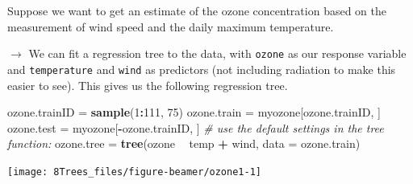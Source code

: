 \documentclass[10pt,ignorenonframetext,]{beamer}
\newenvironment{Shaded}{\begin{snugshade}}{\end{snugshade}}
\newcommand{\KeywordTok}[1]{\textcolor[rgb]{0.13,0.29,0.53}{\textbf{#1}}}
\newcommand{\DataTypeTok}[1]{\textcolor[rgb]{0.13,0.29,0.53}{#1}}
\newcommand{\DecValTok}[1]{\textcolor[rgb]{0.00,0.00,0.81}{#1}}
\newcommand{\StringTok}[1]{\textcolor[rgb]{0.31,0.60,0.02}{#1}}
\newcommand{\CommentTok}[1]{\textcolor[rgb]{0.56,0.35,0.01}{\textit{#1}}}
\newcommand{\OperatorTok}[1]{\textcolor[rgb]{0.81,0.36,0.00}{\textbf{#1}}}
\newcommand{\NormalTok}[1]{#1}
\begin{document}
\begin{frame}[fragile]

Suppose we want to get an estimate of the ozone concentration based on
the measurement of wind speed and the daily maximum temperature.

\(\rightarrow\) We can fit a regression tree to the data, with
\texttt{ozone} as our response variable and \texttt{temperature} and
\texttt{wind} as predictors (not including radiation to make this easier
to see). This gives us the following regression tree.

\end{frame}

\begin{frame}[fragile]

\scriptsize

\begin{Shaded}
\begin{Highlighting}[]
\NormalTok{ozone.trainID =}\StringTok{ }\KeywordTok{sample}\NormalTok{(}\DecValTok{1}\OperatorTok{:}\DecValTok{111}\NormalTok{, }\DecValTok{75}\NormalTok{)}
\NormalTok{ozone.train =}\StringTok{ }\NormalTok{myozone[ozone.trainID, ]}
\NormalTok{ozone.test =}\StringTok{ }\NormalTok{myozone[}\OperatorTok{-}\NormalTok{ozone.trainID, ]}
\CommentTok{# use the default settings in the tree function:}
\NormalTok{ozone.tree =}\StringTok{ }\KeywordTok{tree}\NormalTok{(ozone }\OperatorTok{~}\StringTok{ }\NormalTok{temp }\OperatorTok{+}\StringTok{ }\NormalTok{wind, }\DataTypeTok{data =}\NormalTok{ ozone.train)}
\end{Highlighting}
\end{Shaded}

\begin{center}\texttt{[image: 8Trees\_files/figure-beamer/ozone1-1]} \end{center}

\end{frame}
\end{document}
